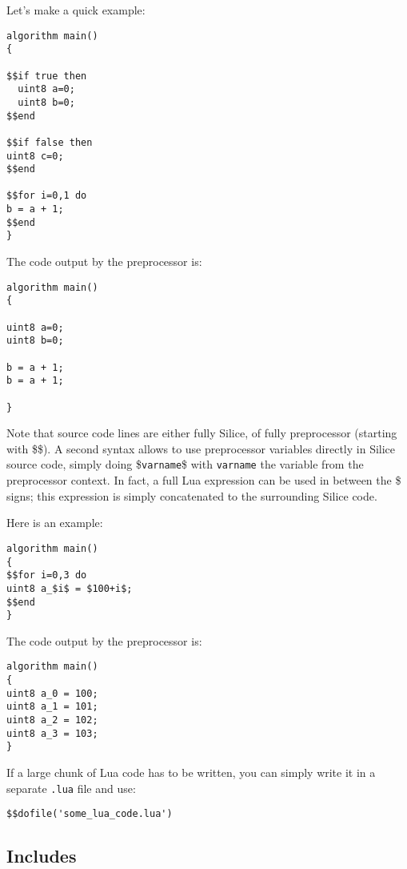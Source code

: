 \documentclass[a4]{article}
\newcommand\silice{Silice}
\begin{document}
Let's make a quick example:

\begin{verbatim}
algorithm main()
{

$$if true then
  uint8 a=0;
  uint8 b=0;
$$end

$$if false then
uint8 c=0;
$$end

$$for i=0,1 do
b = a + 1;
$$end
}
\end{verbatim}

The code output by the preprocessor is:

\begin{verbatim}
algorithm main()
{

uint8 a=0;
uint8 b=0;

b = a + 1;
b = a + 1;

}
\end{verbatim}

Note that source code lines are either fully \silice{}, of fully preprocessor (starting with \$\$). A second syntax allows to use preprocessor variables directly in \silice{} source code, simply doing \$\texttt{varname}\$ with \texttt{varname} the variable from the preprocessor context. In fact, a full Lua expression can be used in between the \$ signs; this expression is simply concatenated to the surrounding \silice{} code.

Here is an example:

\begin{verbatim}
algorithm main()
{
$$for i=0,3 do
uint8 a_$i$ = $100+i$;
$$end
}
\end{verbatim}

The code output by the preprocessor is:

\begin{verbatim}
algorithm main()
{
uint8 a_0 = 100;
uint8 a_1 = 101;
uint8 a_2 = 102;
uint8 a_3 = 103;
}
\end{verbatim}

If a large chunk of Lua code has to be written, you can simply write it in a separate \texttt{.lua} file and use:
\begin{verbatim}
$$dofile('some_lua_code.lua')
\end{verbatim}


\subsection{Includes}
\end{document}
